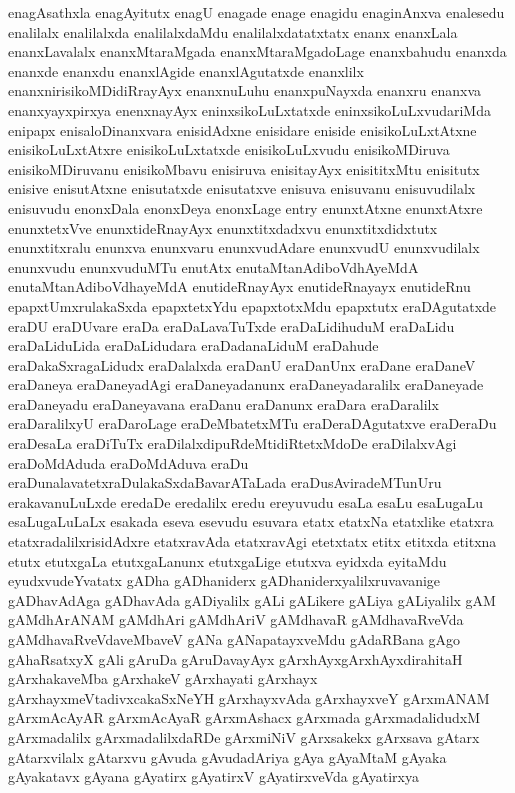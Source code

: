 {enagAsathxla
enagAyitutx
enagU
enagade
enage
enagidu
enaginAnxva
enalesedu
enalilalx
enalilalxda
enalilalxdaMdu
enalilalxdatatxtatx
enanx
enanxLala
enanxLavalalx
enanxMtaraMgada
enanxMtaraMgadoLage
enanxbahudu
enanxda
enanxde
enanxdu
enanxlAgide
enanxlAgutatxde
enanxlilx
enanxnirisikoMDidiRrayAyx
enanxnuLuhu
enanxpuNayxda
enanxru
enanxva
enanxyayxpirxya
enenxnayAyx
eninxsikoLuLxtatxde
eninxsikoLuLxvudariMda
enipapx
enisaloDinanxvara
enisidAdxne
enisidare
eniside
enisikoLuLxtAtxne
enisikoLuLxtAtxre
enisikoLuLxtatxde
enisikoLuLxvudu
enisikoMDiruva
enisikoMDiruvanu
enisikoMbavu
enisiruva
enisitayAyx
enisititxMtu
enisitutx
enisive
enisutAtxne
enisutatxde
enisutatxve
enisuva
enisuvanu
enisuvudilalx
enisuvudu
enonxDala
enonxDeya
enonxLage
entry
enunxtAtxne
enunxtAtxre
enunxtetxVve
enunxtideRnayAyx
enunxtitxdadxvu
enunxtitxdidxtutx
enunxtitxralu
enunxva
enunxvaru
enunxvudAdare
enunxvudU
enunxvudilalx
enunxvudu
enunxvuduMTu
enutAtx
enutaMtanAdiboVdhAyeMdA
enutaMtanAdiboVdhayeMdA
enutideRnayAyx
enutideRnayayx
enutideRnu
epapxtUmxrulakaSxda
epapxtetxYdu
epapxtotxMdu
epapxtutx
eraDAgutatxde
eraDU
eraDUvare
eraDa
eraDaLavaTuTxde
eraDaLidihuduM
eraDaLidu
eraDaLiduLida
eraDaLidudara
eraDadanaLiduM
eraDahude
eraDakaSxragaLidudx
eraDalalxda
eraDanU
eraDanUnx
eraDane
eraDaneV
eraDaneya
eraDaneyadAgi
eraDaneyadanunx
eraDaneyadaralilx
eraDaneyade
eraDaneyadu
eraDaneyavana
eraDanu
eraDanunx
eraDara
eraDaralilx
eraDaralilxyU
eraDaroLage
eraDeMbatetxMTu
eraDeraDAgutatxve
eraDeraDu
eraDesaLa
eraDiTuTx
eraDilalxdipuRdeMtidiRtetxMdoDe
eraDilalxvAgi
eraDoMdAduda
eraDoMdAduva
eraDu
eraDunalavatetxraDulakaSxdaBavarATaLada
eraDusAviradeMTunUru
erakavanuLuLxde
eredaDe
eredalilx
eredu
ereyuvudu
esaLa
esaLu
esaLugaLu
esaLugaLuLaLx
esakada
eseva
esevudu
esuvara
etatx
etatxNa
etatxlike
etatxra
etatxradalilxrisidAdxre
etatxravAda
etatxravAgi
etetxtatx
etitx
etitxda
etitxna
etutx
etutxgaLa
etutxgaLanunx
etutxgaLige
etutxva
eyidxda
eyitaMdu
eyudxvudeYvatatx
gADha
gADhaniderx
gADhaniderxyalilxruvavanige
gADhavAdAga
gADhavAda
gADiyalilx
gALi
gALikere
gALiya
gALiyalilx
gAM
gAMdhArANAM
gAMdhAri
gAMdhAriV
gAMdhavaR
gAMdhavaRveVda
gAMdhavaRveVdaveMbaveV
gANa
gANapatayxveMdu
gAdaRBana
gAgo
gAhaRsatxyX
gAli
gAruDa
gAruDavayAyx
gArxhAyxgArxhAyxdirahitaH
gArxhakaveMba
gArxhakeV
gArxhayati
gArxhayx
gArxhayxmeVtadivxcakaSxNeYH
gArxhayxvAda
gArxhayxveY
gArxmANAM
gArxmAcAyAR
gArxmAcAyaR
gArxmAshacx
gArxmada
gArxmadalidudxM
gArxmadalilx
gArxmadalilxdaRDe
gArxmiNiV
gArxsakekx
gArxsava
gAtarx
gAtarxvilalx
gAtarxvu
gAvuda
gAvudadAriya
gAya
gAyaMtaM
gAyaka
gAyakatavx
gAyana
gAyatirx
gAyatirxV
gAyatirxveVda
gAyatirxya
}
